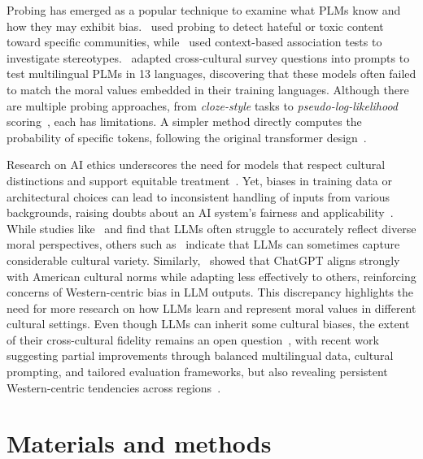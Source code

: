 \documentclass[runningheads]{llncs}
\begin{document}
Probing has emerged as a popular technique to examine what PLMs know and how they may exhibit bias.~\cite{Ousidhoum2021} used probing to detect hateful or toxic content toward specific communities, while~\cite{nadeem2021stereoset} used context-based association tests to investigate stereotypes.~\cite{arora2023probing} adapted cross-cultural survey questions into prompts to test multilingual PLMs in 13 languages, discovering that these models often failed to match the moral values embedded in their training languages. Although there are multiple probing approaches, from \emph{cloze-style} tasks to \emph{pseudo-log-likelihood} scoring~\cite{nadeem2021stereoset,Salazar2019}, each has limitations. A simpler method directly computes the probability of specific tokens, following the original transformer design~\cite{Vaswani2017}.


Research on AI ethics underscores the need for models that respect cultural distinctions and support equitable treatment~\cite{Zowghi2023,cachat2023diversity,Karpouzis2024,Meijer2024}. Yet, biases in training data or architectural choices can lead to inconsistent handling of inputs from various backgrounds, raising doubts about an AI system's fairness and applicability~\cite{Karpouzis2024}. While studies like~\cite{arora2023probing} and \cite{Benkler2023} find that LLMs often struggle to accurately reflect diverse moral perspectives, others such as~\cite{ramezani2023knowledge} indicate that LLMs can sometimes capture considerable cultural variety. Similarly,~\cite{cao2023assessing} showed that ChatGPT aligns strongly with American cultural norms while adapting less effectively to others, reinforcing concerns of Western-centric bias in LLM outputs. This discrepancy highlights the need for more research on how LLMs learn and represent moral values in different cultural settings. Even though LLMs can inherit some cultural biases, the extent of their cross-cultural fidelity remains an open question~\cite{caliskan2017semantics}, with recent work suggesting partial improvements through balanced multilingual data, cultural prompting, and tailored evaluation frameworks, but also revealing persistent Western-centric tendencies across regions~\cite{alkhamissi-etal-2024-investigating,naous-etal-2024-beer,li2024culturellm,tao2024cultural,liu2025value,kwok2024adaptability,sachdeva2025normative}.




\section{Materials and methods}
\end{document}
